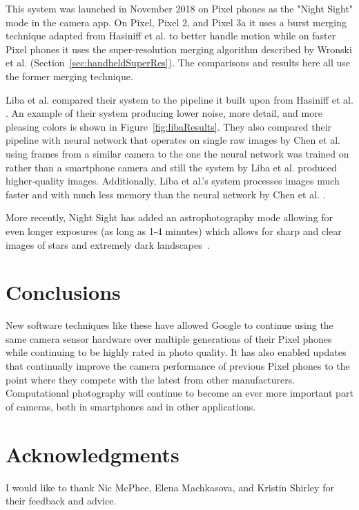 \documentclass{sig-alternate}
\begin{document}
This system was launched in November 2018 on Pixel phones as the "Night Sight" mode in the camera app. On Pixel, Pixel 2, and Pixel 3a it uses a burst merging technique adapted from Hasiniff et al. \cite{Hasinoff2016} to better handle motion while on faster Pixel phones it uses the super-resolution merging algorithm described by Wronski et al. \cite{Wronski2019} (Section~\ref{sec:handheldSuperRes}). The comparisons and results here all use the former merging technique. \cite{Liba2019}

Liba et al. compared their system to the pipeline it built upon from Hasiniff et al. \cite{Hasinoff2016}. An example of their system producing lower noise, more detail, and more pleasing colors is shown in Figure~\ref{fig:libaResults}. They also compared their pipeline with neural network that operates on single raw images by Chen et al.~\cite{Chen2018} using frames from a similar camera to the one the neural network was trained on rather than a smartphone camera and still the system by Liba et al. produced higher-quality images. Additionally, Liba et al.'s system processes images much faster and with much less memory than the neural network by Chen et al. \cite{Chen2018}.~\cite{Liba2019}


More recently, Night Sight has added an astrophotography mode allowing for even longer exposures (as long as 1-4 minutes) which allows for sharp and clear images of stars and extremely dark landscapes~\cite{blog:Kainz2019}.



\section{Conclusions}

New software techniques like these have allowed Google to continue using the same camera sensor hardware over multiple generations of their Pixel phones while continuing to be highly rated in photo quality. It has also enabled updates that continually improve the camera performance of previous Pixel phones to the point where they compete with the latest from other manufacturers. Computational photography will continue to become an ever more important part of cameras, both in smartphones and in other applications.

\section*{Acknowledgments}

I would like to thank Nic McPhee, Elena Machkasova, and Kristin Shirley for their feedback and advice.

\label{sec:acknowledgments}


\pagebreak


  
\end{document}
